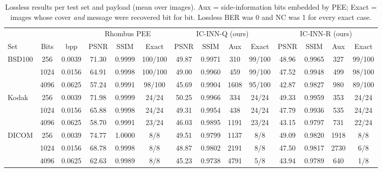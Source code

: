 \begin{table}[t]
\centering
\caption{Lossless results per test set and payload (mean over images). Aux = side-information bits embedded by PEE; Exact = images whose cover \emph{and} message were recovered bit for bit. Lossless BER was 0 and NC was 1 for every exact case.}
\label{tab:main}
\setlength{\tabcolsep}{3.2pt}
\begin{tabular}{lcc|ccc|cccc|cccc}
\toprule
& & & \multicolumn{3}{c|}{Rhombus PEE \cite{sachnev2009}} & \multicolumn{4}{c|}{IC-INN-Q (ours)} & \multicolumn{4}{c}{IC-INN-R (ours)}\\
Set & Bits & bpp & PSNR & SSIM & Exact & PSNR & SSIM & Aux & Exact & PSNR & SSIM & Aux & Exact\\
\midrule
BSD100 & 256 & 0.0039 & 71.30 & 0.9999 & 100/100 & 49.87 & 0.9971 & 310 & 99/100 & 48.96 & 0.9965 & 327 & 99/100\\
 & 1024 & 0.0156 & 64.91 & 0.9998 & 100/100 & 49.00 & 0.9960 & 459 & 99/100 & 47.52 & 0.9948 & 499 & 98/100\\
 & 4096 & 0.0625 & 57.24 & 0.9991 & 98/100 & 45.69 & 0.9904 & 1608 & 95/100 & 42.87 & 0.9827 & 980 & 89/100\\
\midrule
Kodak & 256 & 0.0039 & 71.98 & 0.9999 & 24/24 & 50.25 & 0.9966 & 334 & 24/24 & 49.33 & 0.9959 & 353 & 24/24\\
 & 1024 & 0.0156 & 65.88 & 0.9998 & 24/24 & 49.31 & 0.9954 & 438 & 24/24 & 47.79 & 0.9936 & 535 & 24/24\\
 & 4096 & 0.0625 & 58.70 & 0.9991 & 23/24 & 46.03 & 0.9895 & 1191 & 23/24 & 43.15 & 0.9797 & 731 & 22/24\\
\midrule
DICOM & 256 & 0.0039 & 74.77 & 1.0000 & 8/8 & 49.51 & 0.9799 & 1137 & 8/8 & 49.09 & 0.9820 & 1918 & 8/8\\
 & 1024 & 0.0156 & 68.78 & 0.9998 & 8/8 & 48.87 & 0.9802 & 2191 & 8/8 & 47.50 & 0.9817 & 2730 & 6/8\\
 & 4096 & 0.0625 & 62.63 & 0.9989 & 8/8 & 45.23 & 0.9738 & 4791 & 5/8 & 43.94 & 0.9789 & 640 & 1/8\\
\bottomrule
\end{tabular}
\end{table}
